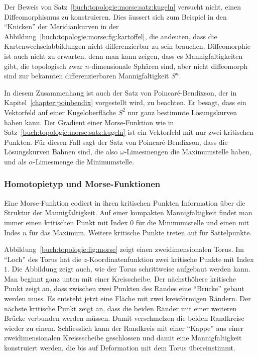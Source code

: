 Der Beweis von Satz~\ref{buch:topologie:morse:satz:kugeln} versucht
nicht, einen Diffeomorphismus zu konstruieren.
Dies äussert sich zum Beispiel in den ``Knicken'' der Meridiankurven
in der Abbildung~\ref{buch:topologie:morse:fig:kartoffel}, die andeuten,
dass die Kartenwechselabbildungen nicht differenzierbar zu sein brauchen.
Diffeomorphie ist auch nicht zu erwarten, denn man kann zeigen, dass es
Mannigfaltigkeiten gibt, die topologisch zwar $n$-dimensionale
Sphären sind, aber nicht diffeomorph sind zur bekannten differenzierbaren
Mannigfaltigkeit $S^n$.

In diesem Zusammenhang ist auch der Satz von Poincaré-Bendixson,
der in Kapitel~\ref{chapter:poinbendix} vorgestellt wird, zu beachten.
Er besagt, dass ein Vektorfeld auf einer Kugeloberfläche $S^2$ nur
ganz bestimmte Lösungskurven haben kann.
Der Gradient einer Morse-Funktion wie in
Satz~\ref{buch:topologie:morse:satz:kugeln}
ist ein Vektorfeld mit nur zwei kritischen Punkten.
Für diesen Fall sagt der Satz von Poincaré-Bendixson, dass die
%
Lösungskurven Bahnen sind, die also $\omega$-Limesmengen die 
%
%
%
%
Maximumstelle haben, und als $\alpha$-Limesmenge die Minimumstelle.

%
%
\subsubsection{Homotopietyp und Morse-Funktionen}
Eine Morse-Funktion codiert in ihren kritischen Punkten Information
über die Struktur der Mannigfaltigkeit.
Auf einer kompakten Mannigfaltigkeit findet man immer einen kritischen
Punkt mit Index $0$ für die Minimumstelle und einen mit Indes $n$ für
das Maximum.
%
Weitere kritische Punkte treten auf für Sattelpunkte.

Abbildung~\ref{buch:topologie:fig:morse} zeigt einen zweidimensionalen
Torus.
Im ``Loch'' des Torus hat die $z$-Koordinatenfunktion zwei kritische Punkte
mit Index $1$.
Die Abbildung zeigt auch, wie der Torus schrittweise aufgebaut werden
kann.
Man beginnt ganz unten mit einer Kreisscheibe.
Der nächsthöhere kritische Punkt zeigt an, dass zwischen zwei Punkten
des Randes eine ``Brücke'' gebaut werden muss.
Es entsteht jetzt eine Fläche mit zwei kreisförmigen Rändern.
Der nächste kritische Punkt zeigt an, dass die beiden Ränder mit
einer weiteren Brücke verbunden werden müssen.
Damit verschmelzen die beiden Randkreise wieder zu einem.
Schliesslich kann der Randkreis mit einer ``Kappe'' aus einer
zweidimensionalen Kreissscheibe geschlossen und damit eine
Mannigfaltigkeit konstruiert werden, die bis auf Deformation mit dem
Torus übereinstimmt.

